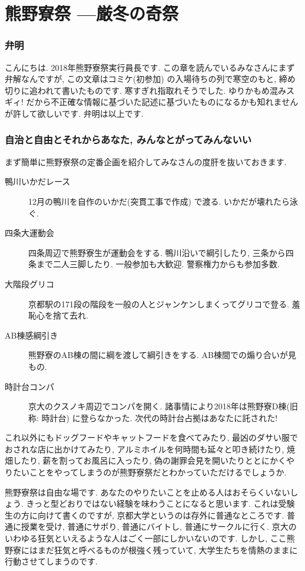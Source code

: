 \documentclass[10pt,b5jsbook,dvips,dvipdfmx,openany]{jsbook}
\theoremstyle{definition}
\begin{document}
\newpage

	\section{熊野寮祭 ---厳冬の奇祭}
			\subsubsection{弁明}
			こんにちは. 2018年熊野寮祭実行員長です. この章を読んでいるみなさんにまず弁解なんですが, この文章はコミケ(初参加) の入場待ちの列で寒空のもと, 締め切りに追われて書いたものです. 寒すぎれ指取れそうでした. ゆりかもめ混みスギィ! だから不正確な情報に基づいた記述に基づいたものになるかも知れませんが許して欲しいです. 弁明は以上です.

			\subsubsection{自治と自由とそれからあなた, みんなとがってみんないい}
			まず簡単に熊野寮祭の定番企画を紹介してみなさんの度肝を抜いておきます.
			\begin{description}
			\item[鴨川いかだレース] 12月の鴨川を自作のいかだ(突貫工事で作成) で渡る. いかだが壊れたら泳ぐ.
			\item[四条大運動会] 四条周辺で熊野寮生が運動会をする. 鴨川沿いで綱引したり, 三条から四条まで二人三脚したり. 一般参加も大歓迎. 警察権力からも参加多数.
			\item[大階段グリコ] 京都駅の171段の階段を一般の人とジャンケンしまくってグリコで登る. 羞恥心を捨て去れ.
			\item[AB棟感綱引き]熊野寮のAB棟の間に綱を渡して綱引きをする. AB棟間での煽り合いが見もの.
			\item[時計台コンパ]京大のクスノキ周辺でコンパを開く. 諸事情により2018年は熊野寮D棟(旧称: 時計台) に登らなかった. 次代の時計台占拠はあなたに託された!
			\end{description}

			これ以外にもドッグフードやキャットフードを食べてみたり, 最凶のダサい服でおされな店に出かけてみたり, アルミホイルを何時間も延々と叩き続けたり, 焼畑したり, 薪を割ってお風呂に入ったり, 偽の謝罪会見を開いたりととにかくやりたいことをやってしまうのが熊野寮祭だとわかっていただけるでしょうか.

			熊野寮祭は自由な場です. あなたのやりたいことを止める人はおそらくいないしょう. きっと型どおりではない経験を味わうことになると思います. これは受験生の方に向けて書くのですが, 京都大学というのは存外に普通なところです. 普通に授業を受け, 普通にサボり, 普通にバイトし, 普通にサークルに行く. 京大のいわゆる狂気といえるような人はごく一部にしかいないのです. しかし, ここ熊野寮にはまだ狂気と呼べるものが根強く残っていて, 大学生たちを情熱のままに行動させてしまうのです.
\end{document}
